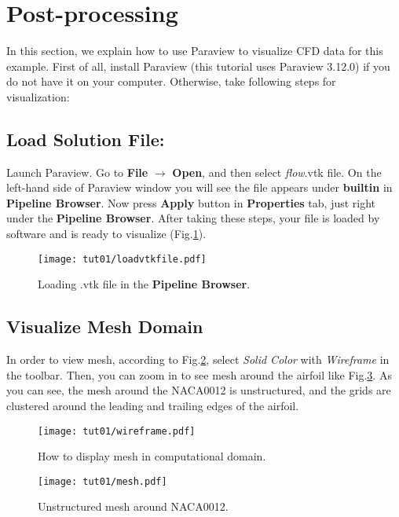 \section{Post-processing}
In this section, we explain how to use Paraview to visualize CFD data for this example. First of all, install Paraview (this tutorial uses Paraview 3.12.0) if you do not have it on your computer. Otherwise, take following steps for visualization:
\subsection{Load Solution File:}
Launch Paraview. Go to \textbf{File} $\rightarrow$ \textbf{Open}, and then select \textit{flow}.vtk file. On the left-hand side of Paraview window you will see the file appears under \textbf{builtin} in \textbf{Pipeline Browser}. Now press \textbf{Apply} button in \textbf{Properties} tab, just right under the  \textbf{Pipeline Browser}. After taking these steps, your file is loaded by software and is ready to visualize (Fig.\ref{fig:load}).
\begin{figure}[htbp]
    \centering
    \texttt{[image: tut01/loadvtkfile.pdf]}
    \caption{Loading .vtk file in the \textbf{Pipeline Browser}.}
    \label{fig:load}
\end{figure}
\subsection{Visualize Mesh Domain}
In order to view mesh, according to Fig.\ref{fig:wireframe}, select \textit{Solid Color} with \textit{Wireframe} in the toolbar. Then, you can zoom in to see mesh around the airfoil like Fig.\ref{fig:mesh}. As you can see, the mesh around the NACA0012 is unstructured, and the grids are clustered around the leading and trailing edges of the airfoil.
\begin{figure}[htbp]
    \centering
    \texttt{[image: tut01/wireframe.pdf]}
    \caption{How to display mesh in computational domain.}
    \label{fig:wireframe}
\end{figure}
\begin{figure}[htbp]
    \centering
    \texttt{[image: tut01/mesh.pdf]}
    \caption{Unstructured mesh around NACA0012.}
    \label{fig:mesh}
\end{figure}
